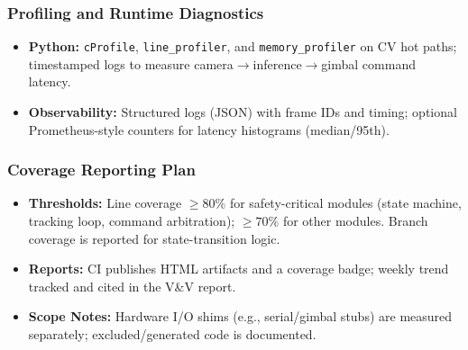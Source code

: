 \documentclass[12pt, titlepage]{article}
\begin{document}
\subsubsection*{Profiling and Runtime Diagnostics}
\begin{itemize}
  \item \textbf{Python:} \texttt{cProfile}, \texttt{line\_profiler}, and
        \texttt{memory\_profiler} on CV hot paths; timestamped logs to measure
        camera$\rightarrow$inference$\rightarrow$gimbal command latency.
  \item \textbf{Observability:} Structured logs (JSON) with frame IDs and timing;
        optional Prometheus-style counters for latency histograms (median/95th).
\end{itemize}

\subsubsection*{Coverage Reporting Plan}
\begin{itemize}
  \item \textbf{Thresholds:} Line coverage $\geq 80\%$ for safety-critical
        modules (state machine, tracking loop, command arbitration); $\geq 70\%$ for other
        modules. Branch coverage is reported for state-transition logic.
  \item \textbf{Reports:} CI publishes HTML artifacts and a coverage badge; weekly trend
        tracked and cited in the V\&V report.
  \item \textbf{Scope Notes:} Hardware I/O shims (e.g., serial/gimbal stubs) are measured
        separately; excluded/generated code is documented.
\end{itemize}



\end{document}

